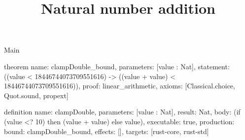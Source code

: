 \begin{lexlean}{Main}
\title{Natural number addition}
\begin{semanticmodule}
theorem{
  name: clampDouble_bound,
  parameters: [value : Nat],
  statement: ((value < 18446744073709551616) -> ((value + value) < 18446744073709551616)),
  proof: linear_arithmetic{},
  axioms: [Classical.choice, Quot.sound, propext]
}

definition{
  name: clampDouble,
  parameters: [value : Nat],
  result: Nat,
  body: (if (value <? 10) then (value + value) else value),
  executable: true,
  production: {bound: clampDouble_bound, effects: [], targets: [rust-core, rust-std]}
}
\end{semanticmodule}
\end{lexlean}
